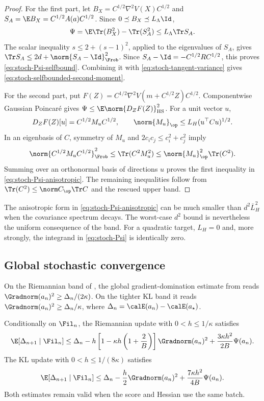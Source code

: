 \begin{proof}
For the first part, let
\(B_X=C^{1/2}\nabla^2V(X)C^{1/2}\) and
\(S_A=\E B_X=C^{1/2}A(a)C^{1/2}\).  Since
\(0\preceq B_X\preceq L_\Lambda\Id\),
\[
  \Psi=\E\Tr(B_X^2)-\Tr(S_A^2)
  \leq L_\Lambda\Tr S_A.
\]
The scalar inequality \(s\leq2+(s-1)^2\), applied to the eigenvalues of
\(S_A\), gives
\(\Tr S_A\leq2d+\norm{S_A-\Id}_{\Frob}^2\).  Since
\(S_A-\Id=-C^{1/2}RC^{1/2}\), this proves
\eqref{eq:stoch-Psi-selfbound}.  Combining it with
\eqref{eq:stoch-tangent-variance} gives
\eqref{eq:stoch-selfbounded-second-moment}.

For the second part, put
\(F(Z)=C^{1/2}\nabla^2V(m+C^{1/2}Z)C^{1/2}\).  Componentwise Gaussian
Poincar\'e gives
\(\Psi\leq\E\norm{D_ZF(Z)}_{\rm HS}^2\).  For a unit vector \(u\),
\[
  D_ZF(Z)[u]=C^{1/2}M_uC^{1/2},
  \qquad
  \norm{M_u}_{\op}\leq L_H(u^\top Cu)^{1/2}.
\]
In an eigenbasis of \(C\), symmetry of \(M_u\) and
\(2c_ic_j\leq c_i^2+c_j^2\) imply
\[
  \norm{C^{1/2}M_uC^{1/2}}_{\Frob}^2
  \leq\Tr(C^2M_u^2)
  \leq\norm{M_u}_{\op}^2\Tr(C^2).
\]
Summing over an orthonormal basis of directions \(u\) proves the first
inequality in \eqref{eq:stoch-Psi-anisotropic}.  The remaining inequalities
follow from
\(\Tr(C^2)\leq\norm C_{\op}\Tr C\) and the rescued upper band.
\end{proof}

The anisotropic form in \eqref{eq:stoch-Psi-anisotropic} can be much smaller
than \(d^2\overline L_H^2\) when the covariance spectrum decays.  The
worst-case \(d^2\) bound is nevertheless the uniform consequence of the
band.  For a quadratic target, \(L_H=0\) and, more strongly, the integrand in
\eqref{eq:stoch-Psi} is identically zero.

\subsection{Global stochastic convergence}
\label{sec:stoch-global}

On the Riemannian band of , the global
gradient-domination estimate from  reads
\(\Gradnorm(a_n)^2\geq\Delta_n/(2\kappa)\).  On the tighter KL band it reads
\(\Gradnorm(a_n)^2\geq\Delta_n/\kappa\), where
\(\Delta_n=\calE(a_n)-\calE(a_\star)\).

\begin{lemma}
\label{lem:stoch-global-onestep}
Conditionally on \(\Fil_n\), the Riemannian update with
\(0<h\leq1/\kappa\) satisfies
\begin{equation}
  \E[\Delta_{n+1}\mid\Fil_n]
  \leq\Delta_n
  -h\left[1-\kappa h\left(1+\frac2B\right)\right]
     \Gradnorm(a_n)^2
  +\frac{3\kappa h^2}{2B}\Psi(a_n).
  \label{eq:stoch-riemannian-onestep}
\end{equation}
The KL update with \(0<h\leq1/(8\kappa)\) satisfies
\begin{equation}
  \E[\Delta_{n+1}\mid\Fil_n]
  \leq\Delta_n-\frac h2\Gradnorm(a_n)^2
  +\frac{7\kappa h^2}{4B}\Psi(a_n).
  \label{eq:stoch-kl-onestep}
\end{equation}
Both estimates remain valid when the score and Hessian use the same batch.
\end{lemma}

